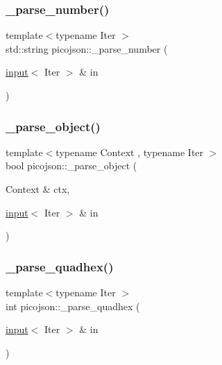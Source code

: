 \hypertarget{namespacepicojson_a771defe1d981b7091c2156bf4720625c}{}\label{namespacepicojson_a771defe1d981b7091c2156bf4720625c} 
\subsubsection{\texorpdfstring{\+\_\+parse\+\_\+number()}{\_parse\_number()}}
{\footnotesize\ttfamily template$<$typename Iter $>$ \\
std\+::string picojson\+::\+\_\+parse\+\_\+number (\begin{DoxyParamCaption}\item[{\hyperlink{classpicojson_1_1input}{input}$<$ Iter $>$ \&}]{in }\end{DoxyParamCaption})\hspace{0.3cm}{\ttfamily [inline]}}

\hypertarget{namespacepicojson_a480ed5e3461568672197a42e259a44c9}{}\label{namespacepicojson_a480ed5e3461568672197a42e259a44c9} 
\subsubsection{\texorpdfstring{\+\_\+parse\+\_\+object()}{\_parse\_object()}}
{\footnotesize\ttfamily template$<$typename Context , typename Iter $>$ \\
bool picojson\+::\+\_\+parse\+\_\+object (\begin{DoxyParamCaption}\item[{Context \&}]{ctx,  }\item[{\hyperlink{classpicojson_1_1input}{input}$<$ Iter $>$ \&}]{in }\end{DoxyParamCaption})\hspace{0.3cm}{\ttfamily [inline]}}

\hypertarget{namespacepicojson_a92d4f60542bbdfe8203f10e1fcce9368}{}\label{namespacepicojson_a92d4f60542bbdfe8203f10e1fcce9368} 
\subsubsection{\texorpdfstring{\+\_\+parse\+\_\+quadhex()}{\_parse\_quadhex()}}
{\footnotesize\ttfamily template$<$typename Iter $>$ \\
int picojson\+::\+\_\+parse\+\_\+quadhex (\begin{DoxyParamCaption}\item[{\hyperlink{classpicojson_1_1input}{input}$<$ Iter $>$ \&}]{in }\end{DoxyParamCaption})\hspace{0.3cm}{\ttfamily [inline]}}

